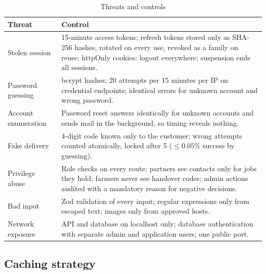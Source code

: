 \documentclass[manuscript,screen,review]{acmart}
\begin{document}
\begin{table}[htbp]
  \caption{Threats and controls}
  \label{tab:security}
  \small
  \begin{tabularx}{\columnwidth}{@{}p{}L@{}}
    \toprule
    \textbf{Threat} & \textbf{Control} \\
    \midrule
    Stolen session & 15-minute access tokens; refresh tokens stored only as SHA-256 hashes, rotated on every use, revoked as a family on reuse; httpOnly cookies; logout everywhere; suspension ends all sessions. \\
    Password guessing & bcrypt hashes; 20 attempts per 15 minutes per IP on credential endpoints; identical errors for unknown account and wrong password. \\
    Account enumeration & Password reset answers identically for unknown accounts and sends mail in the background, so timing reveals nothing. \\
    Fake delivery & 4-digit code known only to the customer; wrong attempts counted atomically, locked after 5 ($\le 0.05\%$ success by guessing). \\
    Privilege abuse & Role checks on every route; partners see contacts only for jobs they hold; farmers never see handover codes; admin actions audited with a mandatory reason for negative decisions. \\
    Bad input & Zod validation of every input; regular expressions only from escaped text; images only from approved hosts. \\
    Network exposure & API and database on localhost only; database authentication with separate admin and application users; one public port. \\
    \bottomrule
  \end{tabularx}
\end{table}

\subsection{Caching strategy}
\end{document}
